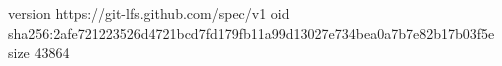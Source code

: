 version https://git-lfs.github.com/spec/v1
oid sha256:2afe721223526d4721bcd7fd179fb11a99d13027e734bea0a7b7e82b17b03f5e
size 43864
